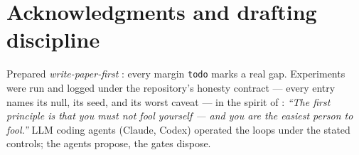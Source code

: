 \documentclass[11pt]{article}
\begin{document}
\section*{Acknowledgments and drafting discipline}
Prepared \emph{write-paper-first} \citep{eisner-paper-first}: every margin \texttt{todo} marks
a real gap. Experiments were run and logged under the repository's honesty contract --- every
entry names its null, its seed, and its worst caveat --- in the spirit of \citet{feynman1974}:
\emph{``The first principle is that you must not fool yourself --- and you are the easiest
person to fool.''} LLM coding agents (Claude, Codex) operated the loops under the stated
controls; the agents propose, the gates dispose.



\end{document}
